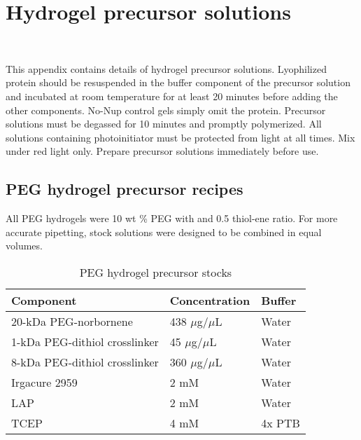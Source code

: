 \chapter{Hydrogel precursor solutions}~\label{appx:precursor-recipes}

This appendix contains details of hydrogel precursor solutions. Lyophilized protein should be resuspended in the buffer component of the precursor solution and incubated at room temperature for at least 20 minutes before adding the other components.  No-Nup control gels simply omit the protein.  Precursor solutions must be degassed for 10 minutes and promptly polymerized.  All solutions containing photoinitiator must be protected from light at all times.  Mix under red light only.  Prepare precursor solutions immediately before use.

\section{PEG hydrogel precursor recipes}

All PEG hydrogels were 10 wt \% PEG with and 0.5 thiol-ene ratio.  For more accurate pipetting, stock solutions were designed to be combined in equal volumes. 

\begin{table}[b!]
\centering
  \caption[PEG hydrogel precursor stocks.]{PEG hydrogel precursor stocks}
    \label{table:Irgacure}
    \begin{tabular}{p{5cm}p{4cm}p{5cm}}
      Component & Concentration & Buffer \\
\hline
20-kDa PEG-norbornene & 438 $\mu$g/$\mu$L & Water \\
1-kDa PEG-dithiol crosslinker & 45 $\mu$g/$\mu$L & Water \\
8-kDa PEG-dithiol crosslinker & 360 $\mu$g/$\mu$L & Water \\
Irgacure 2959 & 2 mM & Water \\
LAP & 2 mM & Water \\
TCEP & 4 mM & 4x PTB \\
\hline
    \end{tabular}
\end{table}

